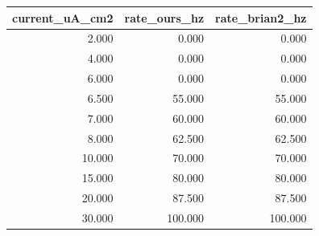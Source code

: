 \begin{tabular}{rrr}
\toprule
current_uA_cm2 & rate_ours_hz & rate_brian2_hz \\
\midrule
2.000 & 0.000 & 0.000 \\
4.000 & 0.000 & 0.000 \\
6.000 & 0.000 & 0.000 \\
6.500 & 55.000 & 55.000 \\
7.000 & 60.000 & 60.000 \\
8.000 & 62.500 & 62.500 \\
10.000 & 70.000 & 70.000 \\
15.000 & 80.000 & 80.000 \\
20.000 & 87.500 & 87.500 \\
30.000 & 100.000 & 100.000 \\
\bottomrule
\end{tabular}

